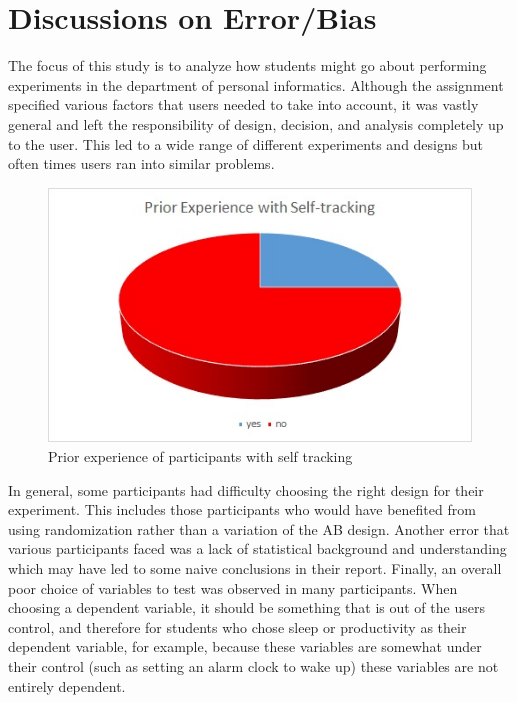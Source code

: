 \section{Discussions on Error/Bias}

The focus of this study is to analyze how students might go about performing experiments in the department of personal informatics. Although the assignment specified various factors that users needed to take into account, it was vastly general and left the responsibility of design, decision, and analysis completely up to the user. This led to a wide range of different experiments and designs but often times users ran into similar problems.

\begin{figure}[!t]\centering
\includegraphics[width=1.0\columnwidth]{images/prior_experience.jpg}
\caption{\footnotesize Prior experience of participants with self tracking \label{fig:experience} 
}
\end{figure}

In general, some participants had difficulty choosing the right design for their experiment. This includes those participants who would have benefited from using randomization rather than a variation of the AB design. Another error that various participants faced was a lack of statistical background and understanding which may have led to some naive conclusions in their report. Finally, an overall poor choice of variables to test was observed in many participants. When choosing a dependent variable, it should be something that is out of the user\textquotesingle s control, and therefore for students who chose sleep or productivity as their dependent variable, for example, because these variables are somewhat under their control (such as setting an alarm clock to wake up) these variables are not entirely dependent.  

